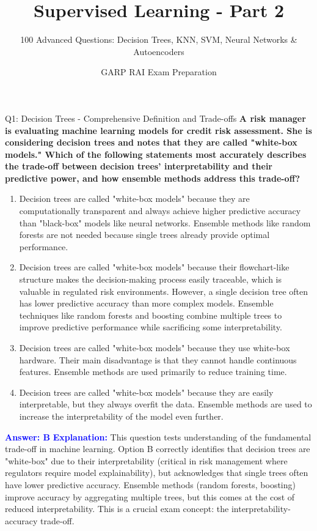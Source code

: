 \documentclass[8pt]{beamer}
\title{Supervised Learning - Part 2}
\subtitle{100 Advanced Questions: Decision Trees, KNN, SVM, Neural Networks \& Autoencoders}
\author{GARP RAI Exam Preparation}
\date{}
\begin{document}
	
	\begin{frame}
		\titlepage
	\end{frame}
	
	
	\begin{frame}{Q1: Decision Trees - Comprehensive Definition and Trade-offs}
		\fontsize{6.5}{7.5}\selectfont
		\textbf{A risk manager is evaluating machine learning models for credit risk assessment. She is considering decision trees and notes that they are called "white-box models." Which of the following statements most accurately describes the trade-off between decision trees' interpretability and their predictive power, and how ensemble methods address this trade-off?}
		
		\begin{enumerate}
			\item Decision trees are called "white-box models" because they are computationally transparent and always achieve higher predictive accuracy than "black-box" models like neural networks. Ensemble methods like random forests are not needed because single trees already provide optimal performance.
			\item Decision trees are called "white-box models" because their flowchart-like structure makes the decision-making process easily traceable, which is valuable in regulated risk environments. However, a single decision tree often has lower predictive accuracy than more complex models. Ensemble techniques like random forests and boosting combine multiple trees to improve predictive performance while sacrificing some interpretability.
			\item Decision trees are called "white-box models" because they use white-box hardware. Their main disadvantage is that they cannot handle continuous features. Ensemble methods are used primarily to reduce training time.
			\item Decision trees are called "white-box models" because they are easily interpretable, but they always overfit the data. Ensemble methods are used to increase the interpretability of the model even further.
		\end{enumerate}
		
		\vspace{0.1cm}
		\textcolor{blue}{\textbf{Answer: B}}
		\vspace{0.1cm}
		\textcolor{blue}{\textbf{Explanation:}} This question tests understanding of the fundamental trade-off in machine learning. Option B correctly identifies that decision trees are "white-box" due to their interpretability (critical in risk management where regulators require model explainability), but acknowledges that single trees often have lower predictive accuracy. Ensemble methods (random forests, boosting) improve accuracy by aggregating multiple trees, but this comes at the cost of reduced interpretability. This is a crucial exam concept: the interpretability-accuracy trade-off.
		

\end{frame}
\end{document}
